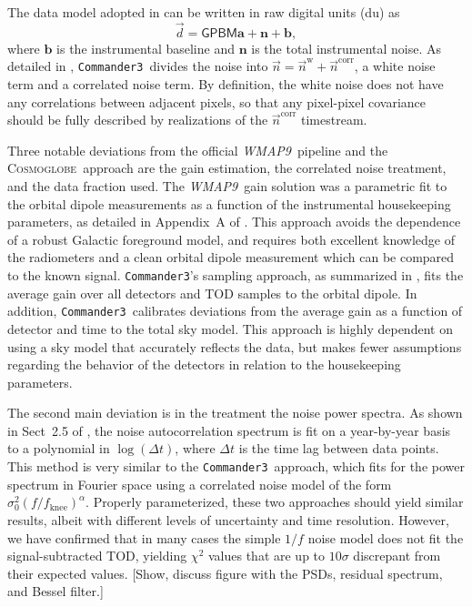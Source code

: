 \documentclass[twocolumn]{../../common/aa}
\def\WMAPnine{\emph{WMAP9}}
\def\commanderthree{\texttt{Commander3}}
\renewcommand{\d}[0]{\vec{d}}
\newcommand{\n}[0]{\vec{n}}
\newcommand{\cosmoglobe}{\textsc{Cosmoglobe}}
\begin{document}
The data model adopted in \citet{hinshaw2003a} can be written in raw digital units (du) as
\begin{equation}
	\d = \mathsf{GPBM}\boldsymbol a+\boldsymbol n+\boldsymbol b,
\end{equation}
where $\boldsymbol b$ is the instrumental baseline and $\boldsymbol n$ is the
total instrumental noise. As detailed in \citet{bp06}, \commanderthree\ divides
the noise into $\n=\n^\mathrm w+\n^\mathrm{corr}$, a white noise term and a
correlated noise term. By definition, the white noise does not have any
correlations between adjacent pixels, so that any pixel-pixel covariance should
be fully described by realizations of the $\n^\mathrm{corr}$ timestream.

Three notable deviations from the official \WMAPnine\ pipeline and the
\cosmoglobe\ approach are the gain estimation, the correlated noise treatment,
and the data fraction used.  The \WMAPnine\ gain solution was a parametric fit
to the orbital dipole measurements as a function of the instrumental
housekeeping parameters, as detailed in Appendix~A of \citet{wmapexsupp}. This
approach avoids the dependence of a robust Galactic foreground model, and
requires both excellent knowledge of the radiometers and a clean orbital dipole
measurement which can be compared to the known signal. \commanderthree's
sampling approach, as summarized in \citet{bp07}, fits the average gain over
all detectors and TOD samples to the orbital dipole. In addition,
\commanderthree\ calibrates deviations from the average gain as a function of
detector and time to the total sky model.  This approach is highly dependent on
using a sky model that accurately reflects the data, but makes fewer
assumptions regarding the behavior of the detectors in relation to the
housekeeping parameters. 


The second main deviation is in the treatment the noise power spectra. As shown
in Sect~2.5 of \citet{jarosik2007}, the noise autocorrelation spectrum is fit
on a year-by-year basis to a polynomial in $\log(\Delta t)$, where $\Delta t$
is the time lag between data points. This method is very similar to the
\commanderthree\ approach, which fits for the power spectrum in Fourier space
using a correlated noise model of the form
$\sigma_0^2(f/f_\mathrm{knee})^{\alpha}$. Properly parameterized, these two
approaches should yield similar results, albeit with different levels of
uncertainty and time resolution. However, we have confirmed that in many cases
the simple $1/f$ noise model does not fit the signal-subtracted TOD, yielding
$\chi^2$ values that are up to $10\sigma$ discrepant from their expected
values.  [Show, discuss figure with the PSDs, residual spectrum, and Bessel
filter.]
\end{document}
